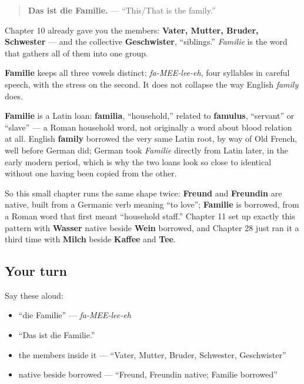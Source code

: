 \begin{quote}
\textbf{Das ist die Familie.} — \textquotedblleft{}This/That is the family.\textquotedblright{}
\end{quote}

Chapter 10 already gave you the members: \textbf{Vater, Mutter, Bruder, Schwester} — and the collective \textbf{Geschwister}, \textquotedblleft{}siblings.\textquotedblright{} \emph{Familie} is the word that gathers all of them into one group.

\begin{sounds}
\textbf{Familie} keeps all three vowels distinct: \emph{fa-MEE-lee-eh}, four syllables in careful speech, with the stress on the second. It does not collapse the way English \emph{family} does.
\end{sounds}

\begin{cousinweb}
\textbf{Familie} is a Latin loan: \textbf{familia}, \textquotedblleft{}household,\textquotedblright{} related to \textbf{famulus}, \textquotedblleft{}servant\textquotedblright{} or \textquotedblleft{}slave\textquotedblright{} — a Roman household word, not originally a word about blood relation at all. English \textbf{family} borrowed the very same Latin root, by way of Old French, well before German did; German took \emph{Familie} directly from Latin later, in the early modern period, which is why the two loans look so close to identical without one having been copied from the other.

So this small chapter runs the same shape twice: \textbf{Freund} and \textbf{Freundin} are native, built from a Germanic verb meaning \textquotedblleft{}to love\textquotedblright{}; \textbf{Familie} is borrowed, from a Roman word that first meant \textquotedblleft{}household staff.\textquotedblright{} Chapter 11 set up exactly this pattern with \textbf{Wasser} native beside \textbf{Wein} borrowed, and Chapter 28 just ran it a third time with \textbf{Milch} beside \textbf{Kaffee} and \textbf{Tee}.
\end{cousinweb}

\subsection*{Your turn}
Say these aloud:

\begin{itemize}
\raggedright
  \item \textquotedblleft{}die Familie\textquotedblright{} — \emph{fa-MEE-lee-eh}
  \item \textquotedblleft{}Das ist die Familie.\textquotedblright{}
  \item the members inside it — \textquotedblleft{}Vater, Mutter, Bruder, Schwester, Geschwister\textquotedblright{}
  \item native beside borrowed — \textquotedblleft{}Freund, Freundin native; Familie borrowed\textquotedblright{}
\end{itemize}

